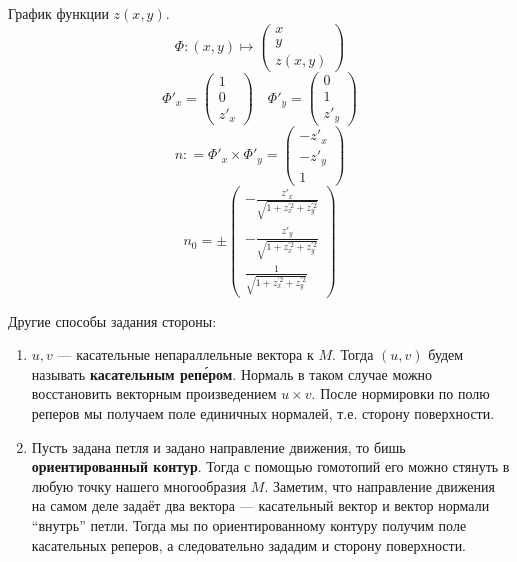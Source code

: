 \begin{example}
    График функции \(z(x, y)\).
    \[\Phi : (x, y) \mapsto \begin{pmatrix} x \\ y \\ z(x, y) \end{pmatrix}\]
    \[\Phi'_x = \begin{pmatrix} 1 \\ 0 \\ z'_x \end{pmatrix} \quad \Phi'_y = \begin{pmatrix} 0 \\ 1 \\ z'_y \end{pmatrix}\]
    \[n : = \Phi'_x \times \Phi'_y = \begin{pmatrix} - z'_x \\ - z'_y \\ 1 \end{pmatrix}\]
    \[n_0 = \pm \begin{pmatrix} - \frac{z'_x}{\sqrt{1 + z_x^{\prime 2} + z_y^{\prime 2}}} \\ - \frac{z'_y}{\sqrt{1 + z_x^{\prime 2} + z_y^{\prime 2}}}  \\ \frac{1}{\sqrt{1 + z_x^{\prime 2} + z_y^{\prime 2}}} \end{pmatrix}\]
\end{example}

Другие способы задания стороны:
\begin{enumerate}
    \item
          \(u, v\) --- касательные непараллельные вектора к \(M\). Тогда \((u, v)\) будем называть \textbf{касательным реп\'ером}. Нормаль в таком случае можно восстановить векторным произведением \(u \times v\). После нормировки по полю реперов мы получаем поле единичных нормалей, т.е. сторону поверхности.
    \item Пусть задана петля и задано направление движения, то бишь \textbf{ориентированный контур}. Тогда с помощью гомотопий его можно стянуть в любую точку нашего многообразия \(M\). Заметим, что направление движения на самом деле задаёт два вектора --- касательный вектор и вектор нормали ``внутрь'' петли. Тогда мы по ориентированному контуру получим поле касательных реперов, а следовательно зададим и сторону поверхности.
\end{enumerate}

